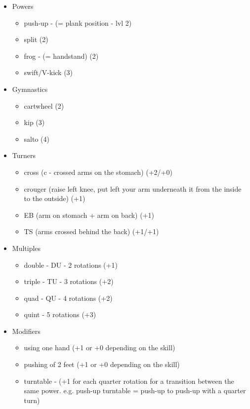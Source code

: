 \begin{itemize}
    \item Powers
    \begin{itemize}
        \item push-up - (= plank position - lvl 2)
        \item split (2)
        \item frog - (= handstand) (2)
        \item swift/V-kick (3)
    \end{itemize}
    \item Gymnastics
    \begin{itemize}
        \item cartwheel (2)
        \item kip (3)
        \item salto (4)
    \end{itemize}
    \item Turners
    \begin{itemize}
        \item cross (c - crossed arms on the stomach) (+2/+0)
        \item crouger (raise left knee, put left your arm underneath it from the inside to the outside) (+1)
        \item EB (arm on stomach + arm on back) (+1)
        \item TS (arms crossed behind the back) (+1/+1)
    \end{itemize}
    \item Multiples
    \begin{itemize}
        \item double - DU - 2 rotations (+1)
        \item triple - TU - 3 rotations (+2)
        \item quad - QU - 4 rotations (+2)
        \item quint - 5 rotations (+3)
    \end{itemize}
    \item Modifiers
    \begin{itemize}
        \item using one hand (+1 or +0 depending on the skill)
        \item pushing of 2 feet (+1 or +0 depending on the skill)
        \item turntable - (+1 for each quarter rotation for a transition between the same power. e.g. push-up turntable = push-up to push-up with a quarter turn)
    \end{itemize}
\end{itemize}

